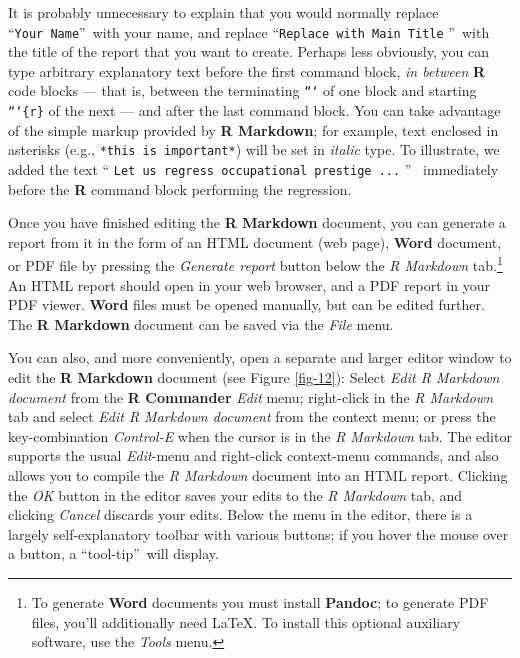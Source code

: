 \documentclass{article}%
\begin{document}
\noindent It is probably unnecessary to explain that you would normally
replace \textquotedblleft\texttt{Your\ Name}\textquotedblright\ with your
name, and replace \textquotedblleft\texttt{Replace\ with\ Main\ Title}%
\textquotedblright\ with the title of the report that you want to create.
Perhaps less obviously, you can type arbitrary explanatory text before the
first command block, \emph{in between} \textbf{R} code blocks --- that is,
between the terminating \texttt{```} of one block and starting \texttt{```\{r\}}
of the next --- and after the last command block. You can take advantage of
the simple markup provided by \textbf{R Markdown}; for example, text enclosed
in asterisks (e.g., \texttt{*this is important*}) will be set in
\textit{italic} type. To illustrate, we added the text \textquotedblleft%
\texttt{Let us regress occupational prestige ...} \textquotedblright%
\ immediately before the \textbf{R} command block performing the regression.

Once you have finished editing the \textbf{R Markdown} document, you can
generate a report from it in the form of an HTML document (web page), \textbf{Word} document,
or PDF file by pressing the \emph{Generate report}
button below the \emph{R Markdown} tab.\footnote{To generate \textbf{Word} documents you must
install \textbf{Pandoc}; to generate PDF files, you'll additionally
need \LaTeX. To install this optional auxiliary software, use the \emph{Tools} menu.}
An HTML report should open in your web browser, and a PDF report in your PDF viewer.
\textbf{Word} files must be opened manually, but can be edited further.
The \textbf{R Markdown} document can be saved via the \emph{File} menu.

You can also, and more conveniently, open a separate and larger editor window to edit the \textbf{R
Markdown} document (see Figure \ref{fig-12}): Select \emph{Edit R Markdown
document} from the \textbf{R Commander} \emph{Edit} menu; right-click in the
\emph{R Markdown} tab and select \emph{Edit R Markdown document} from the
context menu; or press the key-combination \emph{Control-E} when the cursor is
in the \emph{R Markdown} tab. The editor supports the usual \emph{Edit}-menu
and right-click context-menu commands, and also allows you to compile the
\emph{R Markdown} document into an HTML report. Clicking the \emph{OK} button
in the editor saves your edits to the \emph{R Markdown} tab, and clicking
\emph{Cancel} discards your edits. Below the menu in the editor, there is a
largely self-explanatory toolbar with various buttons; if you hover the mouse
over a button, a \textquotedblleft tool-tip\textquotedblright\ will display.%
\end{document}
